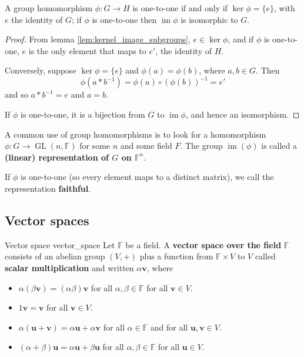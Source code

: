 \begin{lemma}{\cite{math2601_notes}}{}
A group homomorphism $\phi : G \to H$ is one-to-one if and only if $\ker \phi = \{e\}$, with $e$ the identity of $G$; if $\phi$ is one-to-one then $\operatorname{im} \phi$ is isomorphic to $G$.

\begin{proof}
From lemma \ref{lem:kernel_image_subgroups}, $e \in \ker \phi$, and if $\phi$ is one-to-one, $e$ is the only element that maps to $e'$, the identity of $H$.

Conversely, suppose $\ker \phi = \{e\}$ and $\phi (a) = \phi (b)$, where $a, b \in G$. Then
$$ \phi (a * b^{-1}) = \phi (a) \circ (\phi (b))^{-1} = e' $$
and so $a * b^{-1} = e$ and $a = b$.

If $\phi$ is one-to-one, it is a bijection from $G$ to $\operatorname{im} \phi$, and hence an isomorphism.
\end{proof}
\end{lemma}

A common use of group homomorphisms is to look for a homomorphism $\phi : G \to \operatorname{GL}(n, \mathbb{F})$ for some $n$ and some field $F$. The group $\operatorname{im} (\phi)$ is called a \textbf{(linear) representation of $G$ on $\mathbb{F}^n$}.

If $\phi$ is one-to-one (so every element maps to a distinct matrix), we call the representation \textbf{faithful}.

\subsection{Vector spaces}

\begin{definition}{Vector space \cite{math2601_notes}}{vector_space}
Let $\mathbb{F}$ be a field. A \textbf{vector space over the field} $\mathbb{F}$ consists of an abelian group $(V, +)$ plus a function from $\mathbb{F} \times V$ to $V$ called \textbf{scalar multiplication} and written $\alpha \mathbf{v}$, where
\begin{itemize}
	\item $\alpha (\beta \mathbf{v}) = (\alpha \beta) \mathbf{v}$ for all $\alpha, \beta \in \mathbb{F}$ for all $\mathbf{v} \in V$.
	\item $1 \mathbf{v} = \mathbf{v}$ for all $\mathbf{v} \in V$.
	\item $\alpha (\mathbf{u} + \mathbf{v}) = \alpha \mathbf{u} + \alpha \mathbf{v}$ for all $\alpha \in \mathbb{F}$ and for all $\mathbf{u}, \mathbf{v} \in V$.
	\item $(\alpha + \beta) \mathbf{u} = \alpha \mathbf{u} + \beta \mathbf{u}$ for all $\alpha, \beta \in \mathbb{F}$ for all $\mathbf{u} \in V$.
\end{itemize}
\end{definition}

